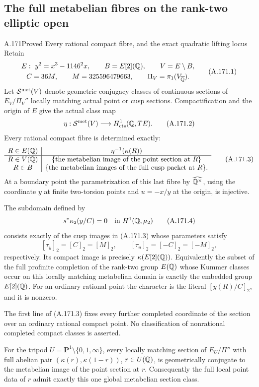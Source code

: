 \subsection{The full metabelian fibres on the rank-two elliptic open}

\begin{statement}{A.171}{Proved}
{Every rational compact fibre, and the exact quadratic lifting locus}
Retain
\[
 \begin{gathered}
 E:\ y^2=x^3-1146^2x,\qquad B=E[2](\mathbb Q),\qquad V=E\setminus B,\\
 C=36M,\qquad M=325596479663,\qquad
 \Pi_V=\pi_1(V_{\overline{\mathbb Q}}).
 \end{gathered}
\tag{A.171.1}
\]
Let \(\mathcal S^{\rm met}(V)\) denote geometric conjugacy
classes of continuous sections of \(E_V/\Pi_V''\) locally matching
actual point or cusp sections.  Compactification and the origin of
\(E\) give the actual class map
\[
           \eta:\mathcal S^{\rm met}(V)
                      \longrightarrow H^1_{\rm cts}(\mathbb Q,TE).
\tag{A.171.2}
\]
Every rational compact fibre is determined exactly:
\[
 \begin{array}{c|c}
 R\in E(\mathbb Q)&\eta^{-1}(\kappa(R))\\\hline
 R\in V(\mathbb Q)&\{\text{the metabelian image of the point section at }R\}\\
 R\in B&\{\text{the metabelian images of the full cusp packet at }R\}.
 \end{array}
\tag{A.171.3}
\]
At a boundary point the parametrization of this last fibre by
\(\widehat{\mathbb Q^\times}\), using the coordinate \(y\) at finite
two-torsion points and \(u=-x/y\) at the origin, is injective.

The subdomain defined by
\[
                s^*\kappa_2(y/C)=0\quad\text{in }H^1(\mathbb Q,\mu_2)
\tag{A.171.4}
\]
consists exactly of the cusp images in (A.171.3) whose parameters
satisfy
\[
                  [\tau_y]_2=[C]_2=[M]_2,
                   \qquad [\tau_u]_2=[-C]_2=[-M]_2,
\tag{A.171.5}
\]
respectively.  Its compact image is precisely
\(\kappa(E[2](\mathbb Q))\).  Equivalently the subset of the full
profinite completion of the rank-two group \(E(\mathbb Q)\) whose
Kummer classes occur on this locally matching metabelian domain is
exactly the embedded group \(E[2](\mathbb Q)\).
For an ordinary rational point the character is the literal
\([y(R)/C]_2\), and it is nonzero.

The first line of (A.171.3) fixes every further completed coordinate
of the section over an ordinary rational compact point.  No
classification of nonrational completed compact classes is asserted.

For the tripod \(U=\mathbf P^1\setminus\{0,1,\infty\}\),
every locally matching section of \(E_U/\Pi''\) with full
abelian pair \((\kappa(r),\kappa(1-r))\),
\(r\in U(\mathbb Q)\), is geometrically conjugate to the metabelian
image of the point section at \(r\).  Consequently the full
local point data of \(r\) admit exactly this one global
metabelian section class.
\end{statement}

